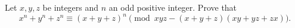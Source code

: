 Let $x,y,z$ be integers and $n$ an odd positive integer. Prove that
\[x^n+y^n+z^n\equiv(x+y+z)^n\pmod{xyz-(x+y+z)(xy+yz+zx)}.\]

